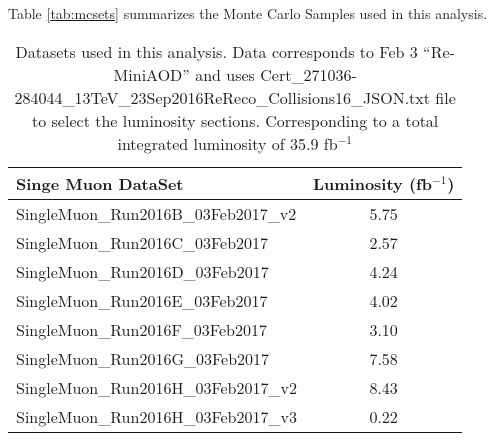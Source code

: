 \documentclass[
    10pt, %
    a4paper, %
    oneside, %
    headinclude,footinclude, %
    BCOR5mm, %
]{scrartcl}
\begin{document}
Table \ref{tab:mcsets} summarizes the Monte Carlo Samples used in this analysis.\\

\begin{table}[H]
    \centering

    \caption{ Datasets used in this analysis. Data corresponds to Feb 3 ``Re-MiniAOD'' and uses 
        {\small Cert\_271036-284044\_13TeV\_23Sep2016ReReco\_Collisions16\_JSON.txt} 
        file to select the luminosity sections.
        Corresponding to a total integrated luminosity of 35.9 fb$^{-1}$}
        \label{tab:datasets}
        \begin{tabular}{|| l c ||}
            \hline
            \textbf{Singe Muon DataSet}  & \textbf{Luminosity (fb$^{-1}$)}\\
            \hline \hline

%
            SingleMuon\_Run2016B\_03Feb2017\_v2 &   5.75  \\
            SingleMuon\_Run2016C\_03Feb2017   &  2.57 \\
            SingleMuon\_Run2016D\_03Feb2017   & 4.24 \\
            SingleMuon\_Run2016E\_03Feb2017   & 4.02 \\
            SingleMuon\_Run2016F\_03Feb2017   & 3.10 \\
            SingleMuon\_Run2016G\_03Feb2017   & 7.58 \\
            SingleMuon\_Run2016H\_03Feb2017\_v2 & 8.43 \\
            SingleMuon\_Run2016H\_03Feb2017\_v3&  0.22 \\



            \hline

        \end{tabular}

\end{table}
\end{document}
